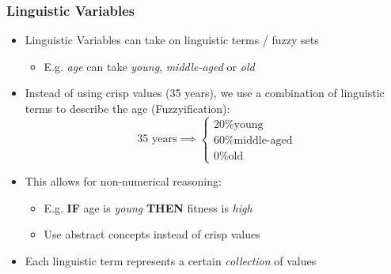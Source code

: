 \documentclass[
	10pt,
	t		%
]{beamer}
\begin{document}
\begin{frame}
	\frametitle{Linguistic Variables}
	\begin{itemize}
		\item Linguistic Variables can take on linguistic terms / fuzzy sets
		      \begin{itemize}
			      \item E.g. \textit{age} can take \textit{young}, \textit{middle-aged} or \textit{old}
		      \end{itemize}
		\item Instead of using crisp values (35 years), we use a combination of linguistic terms to describe the age (Fuzzyification):
		      \[ \text{ 35 years} \implies  \begin{cases}
				      \text{20\% young}       \\
				      \text{60\% middle-aged} \\
				      \text{0\% old}
			      \end{cases}
		      \]
		\item This allows for non-numerical reasoning:
		      \begin{itemize}
			      \item E.g. \textbf{IF} age is \textit{young} \textbf{THEN} fitness is \textit{high}
			      \item Use abstract concepts instead of crisp values
		      \end{itemize}
		\item Each linguistic term represents a certain \textit{collection} of values
	\end{itemize}
\end{frame}
\end{document}
